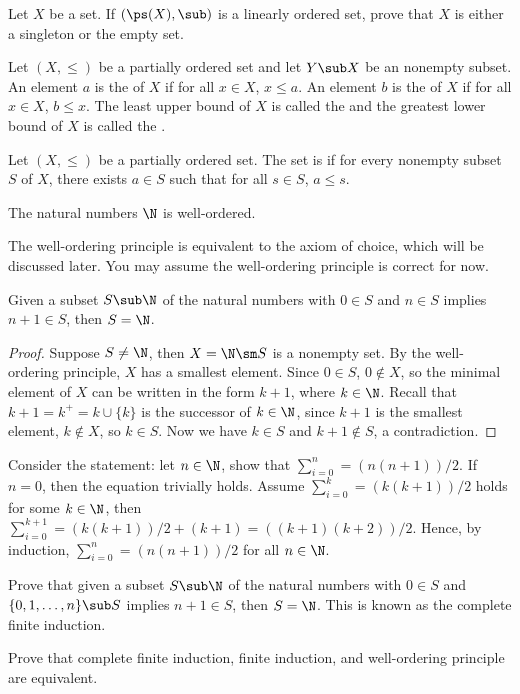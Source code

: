 \documentclass[10pt]{article}
\begin{document}
\begin{problem}
    Let $X$ be a set. If $(\ps(X),\sub)$ is a linearly ordered set, prove that $X$ is either a singleton or the empty set.
\end{problem}
\begin{definition}
    Let $(X,\le)$ be a partially ordered set and let $Y\sub X$ be an nonempty subset. An element $a$ is the  of $X$ if for all $x\in X$, $x\le a$. An element $b$ is the  of $X$ if for all $x\in X$, $b\le x$. The least upper bound of $X$ is called the  and the greatest lower bound of $X$ is called the .
\end{definition}
\begin{definition}
    Let $(X,\le)$ be a partially ordered set. The set is  if for every nonempty subset $S$ of $X$, there exists $a\in S$ such that for all $s\in S$, $a\le s$.
\end{definition}
\begin{theorem}
    The natural numbers $\N$ is well-ordered.
\end{theorem}
\par
The well-ordering principle is equivalent to the axiom of choice, which will be discussed later. You may assume the well-ordering principle is correct for now. 
\begin{theorem}
    Given a subset $S\sub\N$ of the natural numbers with $0\in S$ and $n\in S$ implies $n+1\in S$, then $S=\N$.
\end{theorem}
\begin{proof}
    Suppose $S\ne\N$, then $X=\N\sm S$ is a nonempty set. By the well-ordering principle, $X$ has a smallest element. Since $0\in S$, $0\notin X$, so the minimal element of $X$ can be written in the form $k+1$, where $k\in\N$. Recall that $k+1={k}^{+}=k\cup\{k\}$ is the successor of $k\in\N$, since $k+1$ is the smallest element, $k\notin X$, so $k\in S$. Now we have $k\in S$ and $k+1\notin S$, a contradiction.
\end{proof}
\begin{example}
    Consider the statement: let $n\in\N$, show that ${\sum}_{i=0}^{n}=(n(n+1))/2$. If $n=0$, then the equation trivially holds. Assume ${\sum}_{i=0}^{k}=(k(k+1))/2$ holds for some $k\in\N$, then ${\sum}_{i=0}^{k+1}=(k(k+1))/2+(k+1)=((k+1)(k+2))/2$. Hence, by induction, ${\sum}_{i=0}^{n}=(n(n+1))/2$ for all $n\in\N$.
\end{example}
\begin{problem}
    Prove that given a subset $S\sub\N$ of the natural numbers with $0\in S$ and $\{0,1,\dots,n\}\sub S$ implies $n+1\in S$, then $S=\N$. This is known as the complete finite induction.
\end{problem}
\begin{problem}
    Prove that complete finite induction, finite induction, and well-ordering principle are equivalent.
\end{problem}
\end{document}
